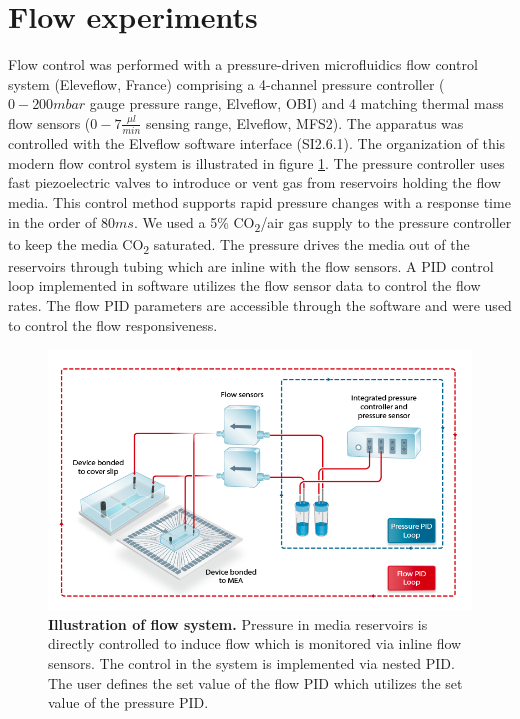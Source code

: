 \section{Flow experiments}
\label{sec:methods:flow}
Flow control was performed with a pressure-driven microfluidics flow control system (Eleveflow, France) comprising a 4-channel pressure controller (\(0-200 mbar\) gauge pressure range, Elveflow, OBI) and 4 matching thermal mass flow sensors (\(0-7 \frac{\mu l}{min}\) sensing range, Elveflow, MFS2). The apparatus was controlled with the Elveflow software interface (SI2.6.1). The organization of this modern flow control system is illustrated in figure \ref{fig:methods:schematics}. The pressure controller uses fast piezoelectric valves to introduce or vent gas from reservoirs holding the flow media. This control method supports rapid pressure changes with a response time in the order of \(80ms\). We used a 5\% CO\textsubscript{2}/air gas supply to the pressure controller to keep the media CO\textsubscript{2} saturated. The pressure drives the media out of the reservoirs through tubing which are inline with the flow sensors. A PID control loop implemented in software utilizes the flow sensor data to control the flow rates. The flow PID parameters are accessible through the software and were used to control the flow responsiveness.

       \begin{figure}[!htb]
            \centering
            \includegraphics[width=14cm]{chapter2/figures/Schematics/schematics.png}
            \caption[Illustration of flow system]{\textbf{Illustration of flow system.} Pressure in media reservoirs is directly controlled to induce flow which is monitored via inline flow sensors. The control in the system is implemented via nested PID. The user defines the set value of the flow PID which utilizes the set value of the pressure PID.}
            \label{fig:methods:schematics}

        \end{figure}


